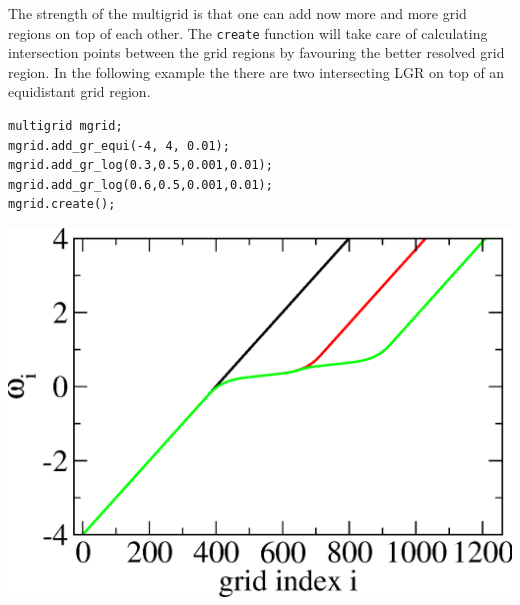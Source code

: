 \documentclass[a4paper]{scrreprt}
\begin{document}
The strength of the multigrid is that one can add now more and more grid regions on top of each other. The \texttt{create} function will take care of calculating intersection points between the grid regions by favouring the better resolved grid region. In the following example the there are two intersecting LGR on top of an equidistant grid region. 
\\
\vspace{1cm}
\noindent\begin{minipage}[l]{0.6\textwidth}
\begin{lstlisting}
multigrid mgrid;
mgrid.add_gr_equi(-4, 4, 0.01);
mgrid.add_gr_log(0.3,0.5,0.001,0.01);
mgrid.add_gr_log(0.6,0.5,0.001,0.01);
mgrid.create();
\end{lstlisting}
\end{minipage}
\begin{minipage}[]{0.4\textwidth}
	\includegraphics[width=1.0\textwidth]{pics/multigrid_02.eps}
\end{minipage}
\end{document}
